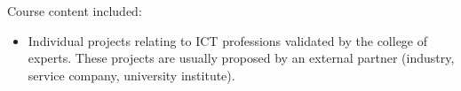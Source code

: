 Course content included:
\begin{itemize}
    \item Individual projects relating to ICT professions validated by the college of experts. These projects are usually proposed by an external partner (industry, service company, university institute).
\end{itemize}